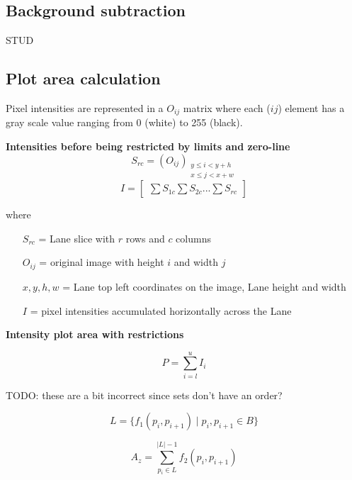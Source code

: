 \subsection{Background subtraction}
STUD

\subsection{Plot area calculation}

Pixel intensities are represented in a \(O_{i j}\) matrix where each (\({i j}\)) element has a gray scale value ranging from 0 (white) to 255 (black).

\textbf{Intensities before being restricted by limits and zero-line}%
\begin{equation}
S_{r c}=(O_{i j})_{\substack{y \leq i < y+h\\ x \leq j < x+w}}
\end{equation}
\begin{equation}
I = \begin{bmatrix}\sum S_{1 c} \sum S_{2 c} ... \sum S_{r c} \end{bmatrix}
\end{equation}

where
\begin{itemize}
    \item [\(S_{r c}\)  =] Lane slice with \(r\) rows and \(c\) columns
    \item [\(O_{i j}\) =] original image with height \(i\) and width \(j\)
    \item [\(x, y, h, w\) =] Lane top left coordinates on the image, Lane height and width
    \item [\(I\)  =] pixel intensities accumulated horizontally across the Lane
\end{itemize}

\textbf{Intensity plot area with restrictions}%

\begin{equation}
P = \sum\limits_{i=l}^u I_{i}
\end{equation}

TODO: these are a bit incorrect since sets don't have an order?

\begin{equation}
L = \lbrace f_{1}(p_{i}, p_{i+1}) \mid p_{i}, p_{i+1} \in B \rbrace
\end{equation}

\begin{equation}
A_{z} = \sum\limits_{p_{i}\in L}^{|L|-1} f_{2}(p_{i}, p_{i+1})
\end{equation}

